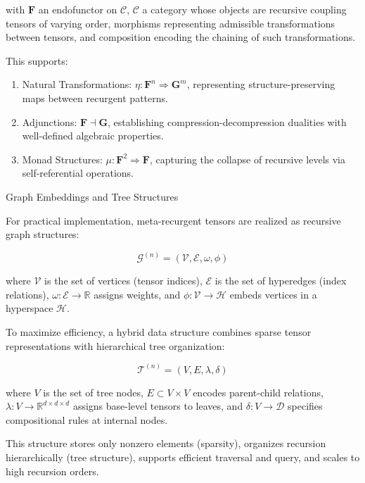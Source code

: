 with \(\mathbf{F}\) an endofunctor on \(\mathcal{C}\), \(\mathcal{C}\) a category whose objects are recursive coupling tensors of varying order, morphisms representing admissible transformations between tensors, and composition encoding the chaining of such transformations.

This supports:
\begin{enumerate}
    \item Natural Transformations: \(\eta: \mathbf{F}^n \Rightarrow \mathbf{G}^m\), representing structure-preserving maps between recurgent patterns.
    \item Adjunctions: \(\mathbf{F} \dashv \mathbf{G}\), establishing compression-decompression dualities with well-defined algebraic properties.
    \item Monad Structures: \(\mu: \mathbf{F}^2 \Rightarrow \mathbf{F}\), capturing the collapse of recursive levels via self-referential operations.
\end{enumerate}

Graph Embeddings and Tree Structures

For practical implementation, meta-recurgent tensors are realized as recursive graph structures:

\begin{equation}
\mathcal{G}^{(n)} = (\mathcal{V}, \mathcal{E}, \omega, \phi)
\end{equation}

where \(\mathcal{V}\) is the set of vertices (tensor indices), \(\mathcal{E}\) is the set of hyperedges (index relations), \(\omega: \mathcal{E} \to \mathbb{R}\) assigns weights, and \(\phi: \mathcal{V} \to \mathcal{H}\) embeds vertices in a hyperspace \(\mathcal{H}\).

To maximize efficiency, a hybrid data structure combines sparse tensor representations with hierarchical tree organization:

\begin{equation}
\mathcal{T}^{(n)} = (V, E, \lambda, \delta)
\end{equation}

where \(V\) is the set of tree nodes, \(E \subset V \times V\) encodes parent-child relations, \(\lambda: V \to \mathbb{R}^{d \times d \times d}\) assigns base-level tensors to leaves, and \(\delta: V \to \mathcal{D}\) specifies compositional rules at internal nodes.

This structure stores only nonzero elements (sparsity), organizes recursion hierarchically (tree structure), supports efficient traversal and query, and scales to high recursion orders.

